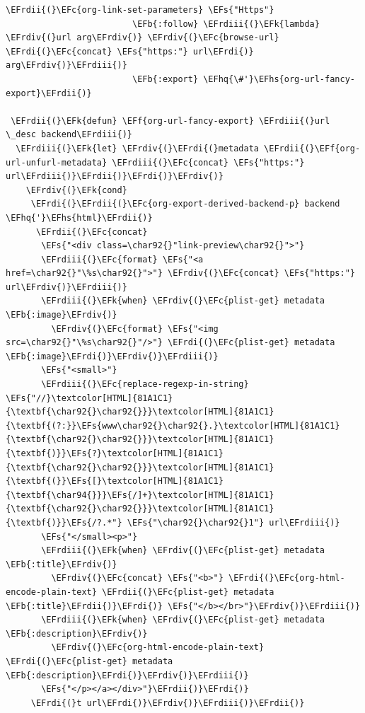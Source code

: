 \documentclass{scrartcl}
\newcommand{\EFk}[1]{\textcolor{EFk}{#1}} %
\newcommand{\EFs}[1]{\textcolor{EFs}{#1}} %
\newcommand{\EFb}[1]{\textcolor{EFb}{#1}} %
\newcommand{\EFc}[1]{\textcolor{EFc}{#1}} %
\newcommand{\EFf}[1]{\textcolor{EFf}{#1}} %
\newcommand{\EFhq}[1]{#1} %
\newcommand{\EFhs}[1]{#1} %
\newcommand{\EFrdi}[1]{#1} %
\newcommand{\EFrdii}[1]{#1} %
\newcommand{\EFrdiii}[1]{#1} %
\newcommand{\EFrdiv}[1]{#1} %
\begin{document}
\begin{Code}
\begin{Verbatim}[]
\EFrdii{(}\EFc{org-link-set-parameters} \EFs{"Https"}
                         \EFb{:follow} \EFrdiii{(}\EFk{lambda} \EFrdiv{(}url arg\EFrdiv{)} \EFrdiv{(}\EFc{browse-url} \EFrdi{(}\EFc{concat} \EFs{"https:"} url\EFrdi{)} arg\EFrdiv{)}\EFrdiii{)}
                         \EFb{:export} \EFhq{\#'}\EFhs{org-url-fancy-export}\EFrdii{)}

 \EFrdii{(}\EFk{defun} \EFf{org-url-fancy-export} \EFrdiii{(}url \_desc backend\EFrdiii{)}
  \EFrdiii{(}\EFk{let} \EFrdiv{(}\EFrdi{(}metadata \EFrdii{(}\EFf{org-url-unfurl-metadata} \EFrdiii{(}\EFc{concat} \EFs{"https:"} url\EFrdiii{)}\EFrdii{)}\EFrdi{)}\EFrdiv{)}
    \EFrdiv{(}\EFk{cond}
     \EFrdi{(}\EFrdii{(}\EFc{org-export-derived-backend-p} backend \EFhq{'}\EFhs{html}\EFrdii{)}
      \EFrdii{(}\EFc{concat}
       \EFs{"<div class=\char92{}"link-preview\char92{}">"}
       \EFrdiii{(}\EFc{format} \EFs{"<a href=\char92{}"\%s\char92{}">"} \EFrdiv{(}\EFc{concat} \EFs{"https:"} url\EFrdiv{)}\EFrdiii{)}
       \EFrdiii{(}\EFk{when} \EFrdiv{(}\EFc{plist-get} metadata \EFb{:image}\EFrdiv{)}
         \EFrdiv{(}\EFc{format} \EFs{"<img src=\char92{}"\%s\char92{}"/>"} \EFrdi{(}\EFc{plist-get} metadata \EFb{:image}\EFrdi{)}\EFrdiv{)}\EFrdiii{)}
       \EFs{"<small>"}
       \EFrdiii{(}\EFc{replace-regexp-in-string} \EFs{"//}\textcolor[HTML]{81A1C1}{\textbf{\char92{}\char92{}}}\textcolor[HTML]{81A1C1}{\textbf{(?:}}\EFs{www\char92{}\char92{}.}\textcolor[HTML]{81A1C1}{\textbf{\char92{}\char92{}}}\textcolor[HTML]{81A1C1}{\textbf{)}}\EFs{?}\textcolor[HTML]{81A1C1}{\textbf{\char92{}\char92{}}}\textcolor[HTML]{81A1C1}{\textbf{(}}\EFs{[}\textcolor[HTML]{81A1C1}{\textbf{\char94{}}}\EFs{/]+}\textcolor[HTML]{81A1C1}{\textbf{\char92{}\char92{}}}\textcolor[HTML]{81A1C1}{\textbf{)}}\EFs{/?.*"} \EFs{"\char92{}\char92{}1"} url\EFrdiii{)}
       \EFs{"</small><p>"}
       \EFrdiii{(}\EFk{when} \EFrdiv{(}\EFc{plist-get} metadata \EFb{:title}\EFrdiv{)}
         \EFrdiv{(}\EFc{concat} \EFs{"<b>"} \EFrdi{(}\EFc{org-html-encode-plain-text} \EFrdii{(}\EFc{plist-get} metadata \EFb{:title}\EFrdii{)}\EFrdi{)} \EFs{"</b></br>"}\EFrdiv{)}\EFrdiii{)}
       \EFrdiii{(}\EFk{when} \EFrdiv{(}\EFc{plist-get} metadata \EFb{:description}\EFrdiv{)}
         \EFrdiv{(}\EFc{org-html-encode-plain-text} \EFrdi{(}\EFc{plist-get} metadata \EFb{:description}\EFrdi{)}\EFrdiv{)}\EFrdiii{)}
       \EFs{"</p></a></div>"}\EFrdii{)}\EFrdi{)}
     \EFrdi{(}t url\EFrdi{)}\EFrdiv{)}\EFrdiii{)}\EFrdii{)}


\end{Verbatim}
\end{Code}
\end{document}
